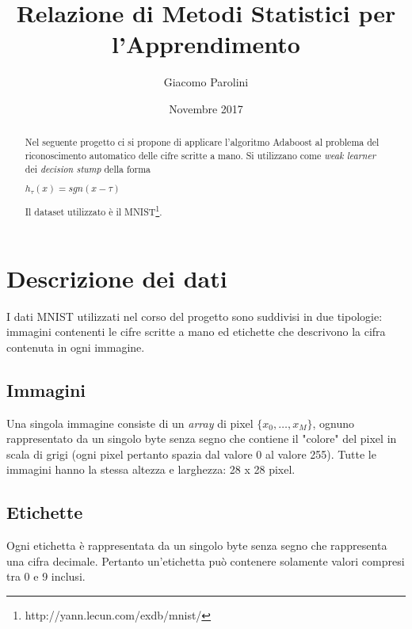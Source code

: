 \documentclass[12pt, letterpaper]{article}
\title{Relazione di Metodi Statistici per l'Apprendimento}
\author{Giacomo Parolini}
\date{Novembre 2017}
\begin{document}
\begin{titlepage}
\maketitle
\end{titlepage}

\begin{abstract}
\noindent
Nel seguente progetto ci si propone di applicare l'algoritmo Adaboost al problema del riconoscimento automatico delle cifre scritte a mano. 
Si utilizzano come {\it weak learner} dei {\it decision stump} della forma
\begin{center}
	\( h_\tau(x) = sgn(x - \tau) \)
\end{center}
Il dataset utilizzato \`e il MNIST\footnote{http://yann.lecun.com/exdb/mnist/}.
\end{abstract}


\section{Descrizione dei dati}
I dati MNIST utilizzati nel corso del progetto sono suddivisi in due tipologie: immagini contenenti le cifre scritte a mano ed etichette che descrivono la cifra contenuta in ogni immagine.

\subsection{Immagini}
Una singola immagine consiste di un {\it array} di pixel \(\{x_0, \dotsc, x_M\}\), ognuno rappresentato da un singolo byte senza segno che contiene il "colore" del pixel in scala di grigi (ogni pixel pertanto spazia dal valore 0 al valore 255). Tutte le immagini hanno la stessa altezza e larghezza: 28 x 28 pixel.

\subsection{Etichette}
Ogni etichetta \`e rappresentata da un singolo byte senza segno che rappresenta una cifra decimale. Pertanto un'etichetta pu\`o contenere solamente valori compresi tra 0 e 9 inclusi.
\end{document}
